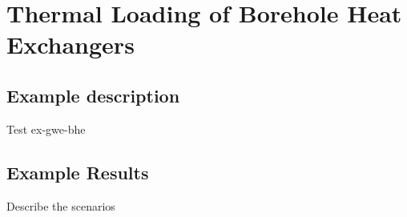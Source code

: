 \section{Thermal Loading of Borehole Heat Exchangers}


\subsection{Example description}

Test ex-gwe-bhe






%

\subsection{Example Results}

Describe the scenarios


